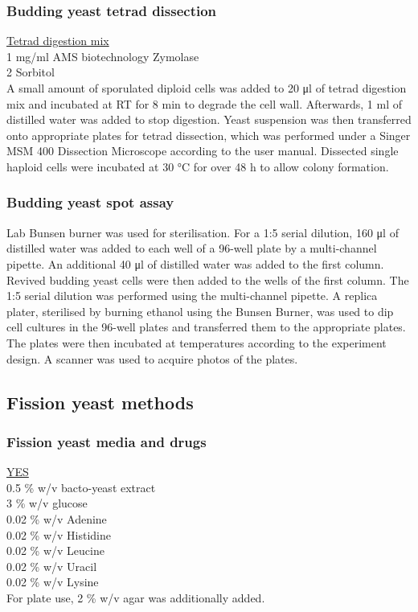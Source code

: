 \subsubsection{Budding yeast tetrad dissection}

\underline{Tetrad digestion mix}\\
1 \si{\milli\gram/\milli\litre} AMS biotechnology Zymolase\\
2 \si{\Molar} Sorbitol \\

A small amount of sporulated diploid cells was added to 20 \si{\micro\litre} of tetrad digestion mix and incubated at RT for 8 \si{\minute} to degrade the cell wall. Afterwards, 1 \si{\milli\litre} of distilled water was added to stop digestion. Yeast suspension was then transferred onto appropriate plates for tetrad dissection, which was performed under a Singer MSM 400 Dissection Microscope according to the user manual. Dissected single haploid cells were incubated at 30 \si{\celsius} for over 48 \si{\hour} to allow colony formation. 

\subsubsection{Budding yeast spot assay}

Lab Bunsen burner was used for sterilisation. For a 1:5 serial dilution, 160 \si{\micro\litre} of distilled water was added to each well of a 96-well plate by a multi-channel pipette. An additional 40 \si{\micro\litre} of distilled water was added to the first column. Revived budding yeast cells were then added to the wells of the first column. The 1:5 serial dilution was performed using the multi-channel pipette. A replica plater, sterilised by burning ethanol using the Bunsen Burner, was used to dip cell cultures in the 96-well plates and transferred them to the appropriate plates. The plates were then incubated at temperatures according to the experiment design. A scanner was used to acquire photos of the plates. 

\subsection{Fission yeast methods}
\subsubsection{Fission yeast media and drugs}

\underline{YES}\\
0.5 \% w/v bacto-yeast extract\\
3 \% w/v glucose\\ 
0.02 \% w/v Adenine\\ 
0.02 \% w/v Histidine\\
0.02 \% w/v Leucine\\ 
0.02 \% w/v Uracil \\ 
0.02 \% w/v Lysine \\
For plate use, 2 \% w/v agar was additionally added.


